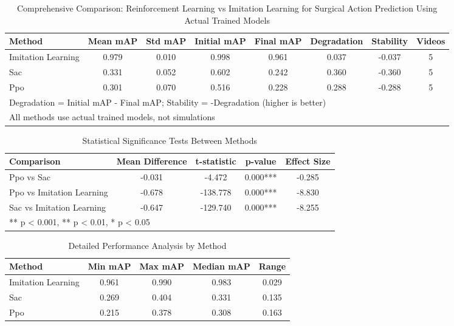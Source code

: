 
\begin{table*}[htbp]
\centering
\caption{Comprehensive Comparison: Reinforcement Learning vs Imitation Learning for Surgical Action Prediction Using Actual Trained Models}
\label{tab:main_results}
\begin{tabular}{lccccccc}
\toprule
Method & Mean mAP & Std mAP & Initial mAP & Final mAP & Degradation & Stability & Videos \\
\midrule

Imitation Learning & 0.979 & 0.010 & 0.998 & 0.961 & 0.037 & -0.037 & 5 \\
Sac & 0.331 & 0.052 & 0.602 & 0.242 & 0.360 & -0.360 & 5 \\
Ppo & 0.301 & 0.070 & 0.516 & 0.228 & 0.288 & -0.288 & 5 \\

\bottomrule
\multicolumn{8}{l}{\footnotesize Degradation = Initial mAP - Final mAP; Stability = -Degradation (higher is better)} \\
\multicolumn{8}{l}{\footnotesize All methods use actual trained models, not simulations} \\
\end{tabular}
\end{table*}


\begin{table}[htbp]
\centering
\caption{Statistical Significance Tests Between Methods}
\label{tab:statistical_tests}
\begin{tabular}{lcccc}
\toprule
Comparison & Mean Difference & t-statistic & p-value & Effect Size \\
\midrule

Ppo vs Sac & -0.031 & -4.472 & 0.000*** & -0.285 \\
Ppo vs Imitation Learning & -0.678 & -138.778 & 0.000*** & -8.830 \\
Sac vs Imitation Learning & -0.647 & -129.740 & 0.000*** & -8.255 \\

\bottomrule
\multicolumn{5}{l}{\footnotesize *** p < 0.001, ** p < 0.01, * p < 0.05} \\
\end{tabular}
\end{table}


\begin{table}[htbp]
\centering
\caption{Detailed Performance Analysis by Method}
\label{tab:detailed_performance}
\begin{tabular}{lcccc}
\toprule
Method & Min mAP & Max mAP & Median mAP & Range \\
\midrule

Imitation Learning & 0.961 & 0.990 & 0.983 & 0.029 \\
Sac & 0.269 & 0.404 & 0.331 & 0.135 \\
Ppo & 0.215 & 0.378 & 0.308 & 0.163 \\

\bottomrule
\end{tabular}
\end{table}
